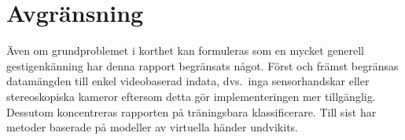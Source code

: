 \documentclass[../rapport_MVEX01-11-05]{subfiles}
\begin{document}
\section{Avgränsning}

Även om grundproblemet i korthet kan formuleras som en mycket generell
gestigenkänning har denna rapport begränsats något. Först och främst
begränsas datamängden till enkel videobaserad indata, dvs.~inga sensorhandskar
eller stereoskopiska kameror eftersom detta gör implementeringen mer
tillgänglig. Dessutom koncentreras rapporten på träningsbara
klassificerare. Till sist har metoder baserade på modeller av virtuella händer
undvikits.


\end{document}
